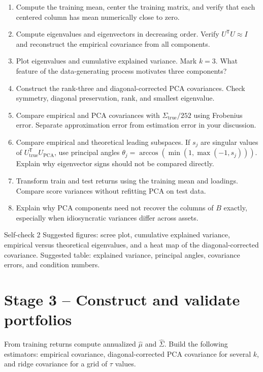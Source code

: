 \documentclass[10pt]{article}
\newcommand{\trans}{^{\mathsf T}}
\begin{document}
\begin{enumerate}[label=\textbf{2.\arabic*.}]
\item Compute the training mean, center the training matrix, and verify that
each centered column has mean numerically close to zero.
\item Compute eigenvalues and eigenvectors in decreasing order. Verify
$U\trans U\approx I$ and reconstruct the empirical covariance from all
components.
\item Plot eigenvalues and cumulative explained variance. Mark $k=3$. What
feature of the data-generating process motivates three components?
\item Construct the rank-three and diagonal-corrected PCA covariances. Check
symmetry, diagonal preservation, rank, and smallest eigenvalue.
\item Compare empirical and PCA covariances with
$\Sigma_{\mathrm{true}}/252$ using Frobenius error. Separate approximation
error from estimation error in your discussion.
\item Compare empirical and theoretical leading subspaces. If
$s_j$ are singular values of $U_{\mathrm{true}}\trans U_{\mathrm{PCA}}$,
use principal angles $\theta_j=\arccos(\min(1,\max(-1,s_j)))$. Explain why
eigenvector signs should not be compared directly.
\item Transform train and test returns using the training mean and loadings.
Compare score variances without refitting PCA on test data.
\item Explain why PCA components need not recover the columns of $B$ exactly,
especially when idiosyncratic variances differ across assets.
\end{enumerate}

\begin{checkpointbox}{Self-check 2}
Suggested figures: scree plot, cumulative explained variance, empirical versus
theoretical eigenvalues, and a heat map of the diagonal-corrected covariance.
Suggested table: explained variance, principal angles, covariance errors, and
condition numbers.
\end{checkpointbox}

\section{Stage 3 -- Construct and validate portfolios}

From training returns compute annualized $\widehat\mu$ and
$\widehat\Sigma$. Build the following estimators: empirical covariance,
diagonal-corrected PCA covariance for several $k$, and ridge covariance for a
grid of $\tau$ values.
\end{document}
